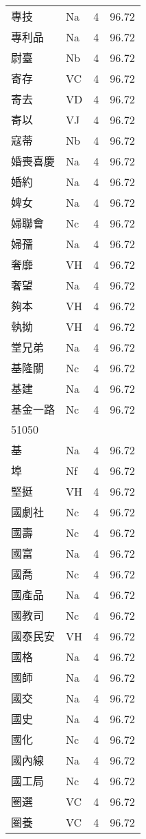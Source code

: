 \documentclass[twocolumn]{book}
\begin{document}
\begin{supertabular}{llrr}
專技 & Na & 4 &  96.72\\
專利品 & Na & 4 &  96.72\\
尉臺 & Nb & 4 &  96.72\\
寄存 & VC & 4 &  96.72\\
寄去 & VD & 4 &  96.72\\
寄以 & VJ & 4 &  96.72\\
寇蒂 & Nb & 4 &  96.72\\
婚喪喜慶 & Na & 4 &  96.72\\
婚約 & Na & 4 &  96.72\\
婢女 & Na & 4 &  96.72\\
婦聯會 & Nc & 4 &  96.72\\
婦孺 & Na & 4 &  96.72\\
奢靡 & VH & 4 &  96.72\\
奢望 & Na & 4 &  96.72\\
夠本 & VH & 4 &  96.72\\
執拗 & VH & 4 &  96.72\\
堂兄弟 & Na & 4 &  96.72\\
基隆關 & Nc & 4 &  96.72\\
基建 & Na & 4 &  96.72\\
基金一路 & Nc & 4 &  96.72\\
51050\\
基 & Na & 4 &  96.72\\
埠 & Nf & 4 &  96.72\\
堅挺 & VH & 4 &  96.72\\
國劇社 & Nc & 4 &  96.72\\
國壽 & Nc & 4 &  96.72\\
國富 & Na & 4 &  96.72\\
國喬 & Nc & 4 &  96.72\\
國產品 & Na & 4 &  96.72\\
國教司 & Nc & 4 &  96.72\\
國泰民安 & VH & 4 &  96.72\\
國格 & Na & 4 &  96.72\\
國師 & Na & 4 &  96.72\\
國交 & Na & 4 &  96.72\\
國史 & Na & 4 &  96.72\\
國化 & Nc & 4 &  96.72\\
國內線 & Na & 4 &  96.72\\
國工局 & Nc & 4 &  96.72\\
圈選 & VC & 4 &  96.72\\
圈養 & VC & 4 &  96.72\\

\end{supertabular}
\end{document}
